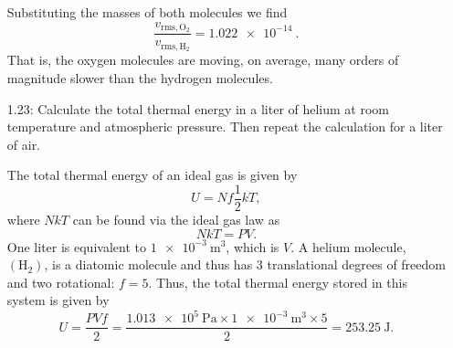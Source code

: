 \documentclass[a4paper, 12pt]{config/homework}
\begin{document}
\begin{enumerate}
Substituting the masses of both molecules we find
\[\frac{v_{\text{rms},\text{O}_2}}{v_{\text{rms},\text{H}_2}} = \qty{1.022e-14}{}.\]
That is, the oxygen molecules are moving, on average, many orders of magnitude slower than the hydrogen molecules.

\vspace{\baselineskip}
\item[1.23:] Calculate the total thermal energy in a liter of helium at room temperature and atmospheric pressure. Then repeat the calculation for a liter of air.

The total thermal energy of an ideal gas is given by
\[U = Nf\frac{1}{2}kT,\]
where \(NkT\) can be found via the ideal gas law as
\[NkT = PV.\]
One liter is equivalent to \(\qty{1e-3}{\meter\cubed}\), which is \(V\). A helium molecule, \((\text{H}_2)\), is a diatomic molecule and thus has 3 translational degrees of freedom and two rotational: \(f=5\). Thus, the total thermal energy stored in this system is given by
\[U = \frac{PVf}{2} = \frac{\qty{1.013e5}{\pascal}\times\qty{1e-3}{\meter\cubed}\times5}{2} = \qty{253.25}{\joule}.\]

\end{enumerate}
\end{document}
